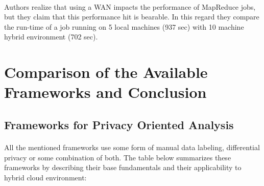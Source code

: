 \documentclass[12pt]{report}
\theoremstyle{named}
\begin{document}
\paragraph{}
Authors realize that using a WAN impacts the performance of MapReduce jobs, but they claim that this performance hit is bearable. In this regard they compare the run-time of a job running on 5 local machines (937 sec) with 10 machine hybrid environment (702 sec).

\section{Comparison of the Available Frameworks and Conclusion}
\subsection{Frameworks for Privacy Oriented Analysis}
\paragraph{}
All the mentioned frameworks use some form of manual data labeling, differential privacy or some combination of both. The table below summarizes these frameworks by describing their base fundamentals and their applicability to hybrid cloud environment:




\begin{table}[ht]
\centering
\caption{Frameworks for privacy Oriented Analysis}
\label{Frameworks for privacy Oriented Analysis}
\end{table}
\end{document}
